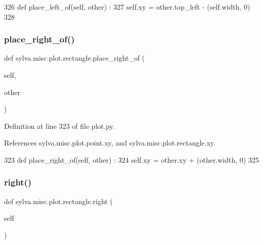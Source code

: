 \begin{DoxyCode}
326     \textcolor{keyword}{def }place\_left\_of(self, other) :
327       self.xy = other.top\_left - (self.width, 0)
328 
\end{DoxyCode}
\mbox{\label{classsylva_1_1misc_1_1plot_1_1rectangle_a614690234b91159164255ffc1a32f8be}} 
\subsubsection{\texorpdfstring{place\+\_\+right\+\_\+of()}{place\_right\_of()}}
{\footnotesize\ttfamily def sylva.\+misc.\+plot.\+rectangle.\+place\+\_\+right\+\_\+of (\begin{DoxyParamCaption}\item[{}]{self,  }\item[{}]{other }\end{DoxyParamCaption})}



Definition at line 323 of file plot.\+py.



References sylva.\+misc.\+plot.\+point.\+xy, and sylva.\+misc.\+plot.\+rectangle.\+xy.


\begin{DoxyCode}
323     \textcolor{keyword}{def }place\_right\_of(self, other) :
324       self.xy = other.xy + (other.width, 0)
325 
\end{DoxyCode}
\mbox{\label{classsylva_1_1misc_1_1plot_1_1rectangle_a50bdb9a7a95b6e03a66ce8031649ff9f}} 
\subsubsection{\texorpdfstring{right()}{right()}}
{\footnotesize\ttfamily def sylva.\+misc.\+plot.\+rectangle.\+right (\begin{DoxyParamCaption}\item[{}]{self }\end{DoxyParamCaption})}



